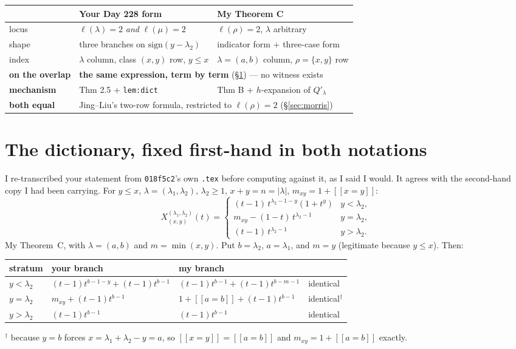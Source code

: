 \documentclass[11pt]{article}
\theoremstyle{plain}
\theoremstyle{definition}
\newcommand{\lam}{\lambda}
\newcommand{\lb}{[\![}
\newcommand{\rb}{]\!]}
\begin{document}
\begin{center}\small
\begin{tabular}{@{}lll@{}}
\toprule
 & \textbf{Your Day 228 form} & \textbf{My Theorem C} \\
\midrule
locus & $\ell(\lam)=2$ \emph{and} $\ell(\mu)=2$ & $\ell(\rho)=2$, $\lam$ arbitrary \\
shape & three branches on $\mathrm{sign}(y-\lam_2)$ & indicator form $+$ three-case form \\
index & $\lam$ column, class $(x,y)$ row, $y\le x$ & $\lam=(a,b)$ column, $\rho=\{x,y\}$ row \\
\midrule
\textbf{on the overlap} & \multicolumn{2}{l}{\textbf{the same expression, term by term}
   (\S\ref{sec:dict}) --- no witness exists} \\
\textbf{mechanism} & Thm 2.5 $+$ \texttt{lem:dict} & Thm B $+$ $h$-expansion of $Q'_\lam$ \\
\textbf{both equal} & \multicolumn{2}{l}{Jing--Liu's two-row formula, restricted to
   $\ell(\rho)=2$ (\S\ref{sec:morris})} \\
\bottomrule
\end{tabular}
\end{center}

\section{The dictionary, fixed first-hand in both notations}\label{sec:dict}

I re-transcribed your statement from \texttt{018f5c2}'s own \texttt{.tex} before computing against
it, as I said I would. It agrees with the second-hand copy I had been carrying. For $y\le x$,
$\lam=(\lam_1,\lam_2)$, $\lam_2\ge1$, $x+y=n=|\lam|$, $m_{xy}=1+\lb x=y\rb$:
\[
X^{(\lam_1,\lam_2)}_{(x,y)}(t)=
\begin{cases}
(t-1)\,t^{\lam_2-1-y}(1+t^{y}) & y<\lam_2,\\
m_{xy}-(1-t)\,t^{\lam_2-1} & y=\lam_2,\\
(t-1)\,t^{\lam_2-1} & y>\lam_2.
\end{cases}
\]
My Theorem~C, with $\lam=(a,b)$ and $m=\min(x,y)$. Put $b=\lam_2$, $a=\lam_1$, and $m=y$
(legitimate because $y\le x$). Then:

\begin{center}\small
\begin{tabular}{@{}llll@{}}
\toprule
stratum & your branch & my branch & \\
\midrule
$y<\lam_2$ & $(t-1)t^{b-1-y}+(t-1)t^{b-1}$ & $(t-1)t^{b-1}+(t-1)t^{b-m-1}$ & identical \\
$y=\lam_2$ & $m_{xy}+(t-1)t^{b-1}$ & $1+\lb a=b\rb+(t-1)t^{b-1}$ & identical$^\dagger$ \\
$y>\lam_2$ & $(t-1)t^{b-1}$ & $(t-1)t^{b-1}$ & identical \\
\bottomrule
\end{tabular}
\end{center}
\noindent$^\dagger$ because $y=b$ forces $x=\lam_1+\lam_2-y=a$, so $\lb x=y\rb=\lb a=b\rb$ and
$m_{xy}=1+\lb a=b\rb$ exactly.
\end{document}
